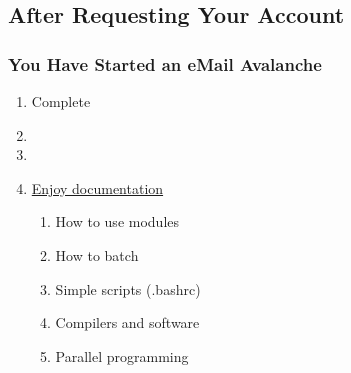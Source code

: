 \subsection{After Requesting Your Account}
\begin{frame}\frametitle{You Have Started an eMail Avalanche}
    \centering
	\begin{enumerate}
	\item Complete \href{https://public.cyber.mil/training/cyber-awareness-challenge/}{} 
	\item {}
	\item {}
	\item \href{https://centers.hpc.mil/users/docs/index.html}{Enjoy documentation}
	\begin{enumerate}
		\item How to use modules
		\item How to batch
		\item Simple scripts (.bashrc)
		\item Compilers and software
		\item Parallel programming
	\end{enumerate}
	\end{enumerate}
\end{frame}
%
%




\endinput  %
